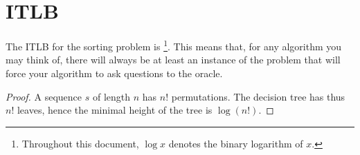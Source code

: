 \section{ITLB}
\label{tree:sorting:ITLB}

\begin{theorem}
The ITLB for the sorting problem is \footnote{Throughout
this document, $\log x$ denotes the binary logarithm of $x$.}. This means that,
for any algorithm you may think of, there will always be at least an instance
of the problem that will force your algorithm to ask 
questions to the oracle.
\end{theorem}

\begin{proof}
A sequence $s$ of length $n$ has $n!$ permutations. The decision tree has thus
$n!$ leaves, hence the minimal height of the tree is $\log(n!)$.
\end{proof}

